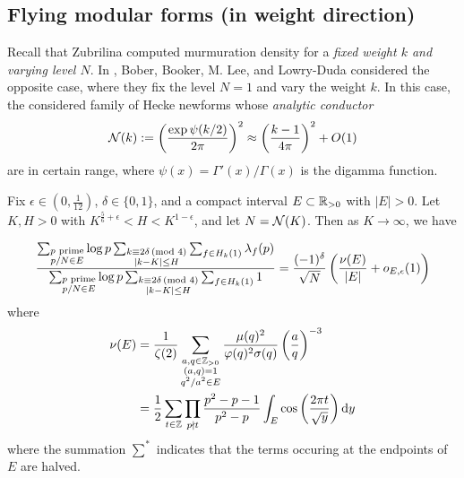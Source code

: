 \subsection{Flying modular forms (in weight direction)}

Recall that Zubrilina computed murmuration density for a \emph{fixed weight $k$ and varying level $N$}.
In \cite{bober2023murmurations}, Bober, Booker, M. Lee, and Lowry-Duda considered the opposite case, where they fix the level $N = 1$ and vary the weight $k$.
In this case, the considered family of Hecke newforms whose \emph{analytic conductor}
\[
\mathcal{N}(k) := \left(\frac{\exp \psi(k/2)}{2 \pi}\right)^2 \approx \left(\frac{k-1}{4 \pi}\right)^2 + O(1)
\]
are in certain range, where $\psi(x) = \Gamma'(x)/\Gamma(x)$ is the digamma function.

\begin{theorem}
    Fix $\epsilon \in (0, \frac{1}{12})$, $\delta \in \{0, 1\}$, and a compact interval $E \subset \mathbb{R}_{> 0}$ with $|E| > 0$.
    Let $K, H > 0$ with $K^{\frac{5}{6} + \epsilon} < H < K^{1 - \epsilon}$, and let $N = \mathcal{N}(K)$.
    Then as $K \to \infty$, we have

    \begin{equation}
        \frac{
            \sum_{\substack{p \text{ prime} \\ p / N \in E}}
            \log p
            \sum_{\substack{k \equiv 2 \delta \,(\text{mod }4) \\ |k - K| \le H}}
            \sum_{f \in H_k(1)} \lambda_f(p)
        }
        {
            \sum_{\substack{p \text{ prime} \\ p / N \in E}} 
            \log p 
            \sum_{\substack{k \equiv 2 \delta \,(\text{mod }4) \\ |k - K| \le H}} 
            \sum_{f \in H_k(1)} 1
        } = \frac{(-1)^\delta}{\sqrt{N}} \left(\frac{\nu(E)}{|E|} + o_{E, \epsilon}(1)\right)
    \end{equation}
    where
    \begin{align}
        \nu(E) &= \frac{1}{\zeta(2)} \sum_{\substack{a, q \in \mathbb{Z}_{>0} \\ (a, q) = 1 \\ q^2 / a^2 \in E}} \frac{\mu(q)^2}{\varphi(q)^2 \sigma(q)} \left(\frac{a}{q}\right)^{-3} \\
        &= \frac{1}{2} \sum_{t \in \mathbb{Z}} \prod_{p \nmid t} \frac{p^2 - p - 1}{p^2 - p} \int_E \cos\left(\frac{2 \pi t}{\sqrt{y}}\right) \mathrm{d} y
    \end{align}
    where the summation $\sum^{*}$ indicates that the terms occuring at the endpoints of $E$ are halved. 
\end{theorem}

